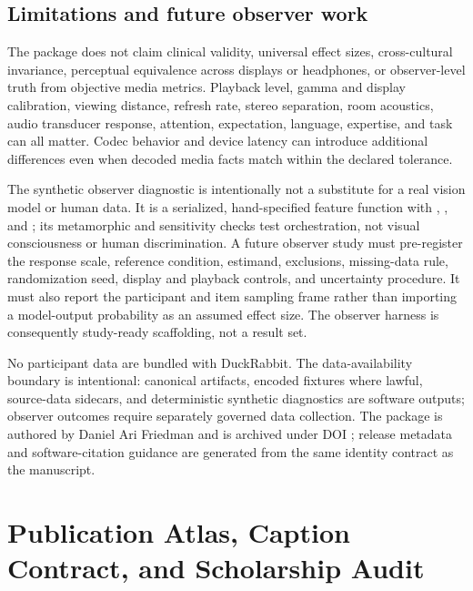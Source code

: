 \documentclass[
  english,
]{article}
\newcounter{none} %
\begin{document}
\subsection{Limitations and future observer
work}\label{limitations-and-future-observer-work}

The package does not claim clinical validity, universal effect sizes,
cross-cultural invariance, perceptual equivalence across displays or
headphones, or observer-level truth from objective media metrics.
Playback level, gamma and display calibration, viewing distance, refresh
rate, stereo separation, room acoustics, audio transducer response,
attention, expectation, language, expertise, and task can all matter.
Codec behavior and device latency can introduce additional differences
even when decoded media facts match within the declared tolerance.

The synthetic observer diagnostic is intentionally not a substitute for
a real vision model or human data. It is a serialized, hand-specified
feature function with ,
, and ; its
metamorphic and sensitivity checks test orchestration, not visual
consciousness or human discrimination. A future observer study must
pre-register the response scale, reference condition, estimand,
exclusions, missing-data rule, randomization seed, display and playback
controls, and uncertainty procedure. It must also report the participant
and item sampling frame rather than importing a model-output probability
as an assumed effect size. The observer harness is consequently
study-ready scaffolding, not a result set.

No participant data are bundled with DuckRabbit. The data-availability
boundary is intentional: canonical artifacts, encoded fixtures where
lawful, source-data sidecars, and deterministic synthetic diagnostics
are software outputs; observer outcomes require separately governed data
collection. The package is authored by Daniel Ari Friedman and is
archived under DOI ; release metadata
and software-citation guidance are generated from the same identity
contract as the manuscript.

\newpage

\section{Publication Atlas, Caption Contract, and Scholarship
Audit}\label{sec:publication_audit}
\end{document}
